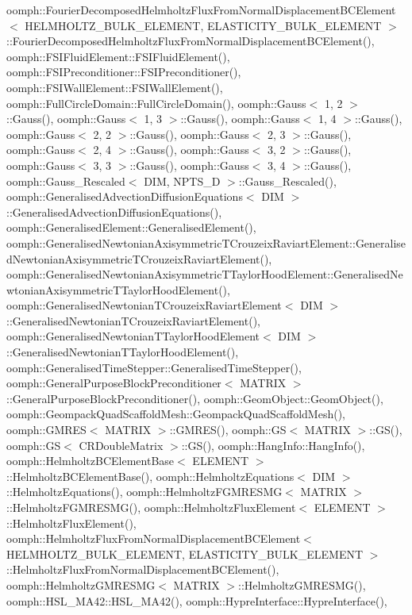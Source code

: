 oomph\+::\+Fourier\+Decomposed\+Helmholtz\+Flux\+From\+Normal\+Displacement\+B\+C\+Element$<$ H\+E\+L\+M\+H\+O\+L\+T\+Z\+\_\+\+B\+U\+L\+K\+\_\+\+E\+L\+E\+M\+E\+N\+T, E\+L\+A\+S\+T\+I\+C\+I\+T\+Y\+\_\+\+B\+U\+L\+K\+\_\+\+E\+L\+E\+M\+E\+N\+T $>$\+::\+Fourier\+Decomposed\+Helmholtz\+Flux\+From\+Normal\+Displacement\+B\+C\+Element(), oomph\+::\+F\+S\+I\+Fluid\+Element\+::\+F\+S\+I\+Fluid\+Element(), oomph\+::\+F\+S\+I\+Preconditioner\+::\+F\+S\+I\+Preconditioner(), oomph\+::\+F\+S\+I\+Wall\+Element\+::\+F\+S\+I\+Wall\+Element(), oomph\+::\+Full\+Circle\+Domain\+::\+Full\+Circle\+Domain(), oomph\+::\+Gauss$<$ 1, 2 $>$\+::\+Gauss(), oomph\+::\+Gauss$<$ 1, 3 $>$\+::\+Gauss(), oomph\+::\+Gauss$<$ 1, 4 $>$\+::\+Gauss(), oomph\+::\+Gauss$<$ 2, 2 $>$\+::\+Gauss(), oomph\+::\+Gauss$<$ 2, 3 $>$\+::\+Gauss(), oomph\+::\+Gauss$<$ 2, 4 $>$\+::\+Gauss(), oomph\+::\+Gauss$<$ 3, 2 $>$\+::\+Gauss(), oomph\+::\+Gauss$<$ 3, 3 $>$\+::\+Gauss(), oomph\+::\+Gauss$<$ 3, 4 $>$\+::\+Gauss(), oomph\+::\+Gauss\+\_\+\+Rescaled$<$ D\+I\+M, N\+P\+T\+S\+\_\+D $>$\+::\+Gauss\+\_\+\+Rescaled(), oomph\+::\+Generalised\+Advection\+Diffusion\+Equations$<$ D\+I\+M $>$\+::\+Generalised\+Advection\+Diffusion\+Equations(), oomph\+::\+Generalised\+Element\+::\+Generalised\+Element(), oomph\+::\+Generalised\+Newtonian\+Axisymmetric\+T\+Crouzeix\+Raviart\+Element\+::\+Generalised\+Newtonian\+Axisymmetric\+T\+Crouzeix\+Raviart\+Element(), oomph\+::\+Generalised\+Newtonian\+Axisymmetric\+T\+Taylor\+Hood\+Element\+::\+Generalised\+Newtonian\+Axisymmetric\+T\+Taylor\+Hood\+Element(), oomph\+::\+Generalised\+Newtonian\+T\+Crouzeix\+Raviart\+Element$<$ D\+I\+M $>$\+::\+Generalised\+Newtonian\+T\+Crouzeix\+Raviart\+Element(), oomph\+::\+Generalised\+Newtonian\+T\+Taylor\+Hood\+Element$<$ D\+I\+M $>$\+::\+Generalised\+Newtonian\+T\+Taylor\+Hood\+Element(), oomph\+::\+Generalised\+Time\+Stepper\+::\+Generalised\+Time\+Stepper(), oomph\+::\+General\+Purpose\+Block\+Preconditioner$<$ M\+A\+T\+R\+I\+X $>$\+::\+General\+Purpose\+Block\+Preconditioner(), oomph\+::\+Geom\+Object\+::\+Geom\+Object(), oomph\+::\+Geompack\+Quad\+Scaffold\+Mesh\+::\+Geompack\+Quad\+Scaffold\+Mesh(), oomph\+::\+G\+M\+R\+E\+S$<$ M\+A\+T\+R\+I\+X $>$\+::\+G\+M\+R\+E\+S(), oomph\+::\+G\+S$<$ M\+A\+T\+R\+I\+X $>$\+::\+G\+S(), oomph\+::\+G\+S$<$ C\+R\+Double\+Matrix $>$\+::\+G\+S(), oomph\+::\+Hang\+Info\+::\+Hang\+Info(), oomph\+::\+Helmholtz\+B\+C\+Element\+Base$<$ E\+L\+E\+M\+E\+N\+T $>$\+::\+Helmholtz\+B\+C\+Element\+Base(), oomph\+::\+Helmholtz\+Equations$<$ D\+I\+M $>$\+::\+Helmholtz\+Equations(), oomph\+::\+Helmholtz\+F\+G\+M\+R\+E\+S\+M\+G$<$ M\+A\+T\+R\+I\+X $>$\+::\+Helmholtz\+F\+G\+M\+R\+E\+S\+M\+G(), oomph\+::\+Helmholtz\+Flux\+Element$<$ E\+L\+E\+M\+E\+N\+T $>$\+::\+Helmholtz\+Flux\+Element(), oomph\+::\+Helmholtz\+Flux\+From\+Normal\+Displacement\+B\+C\+Element$<$ H\+E\+L\+M\+H\+O\+L\+T\+Z\+\_\+\+B\+U\+L\+K\+\_\+\+E\+L\+E\+M\+E\+N\+T, E\+L\+A\+S\+T\+I\+C\+I\+T\+Y\+\_\+\+B\+U\+L\+K\+\_\+\+E\+L\+E\+M\+E\+N\+T $>$\+::\+Helmholtz\+Flux\+From\+Normal\+Displacement\+B\+C\+Element(), oomph\+::\+Helmholtz\+G\+M\+R\+E\+S\+M\+G$<$ M\+A\+T\+R\+I\+X $>$\+::\+Helmholtz\+G\+M\+R\+E\+S\+M\+G(), oomph\+::\+H\+S\+L\+\_\+\+M\+A42\+::\+H\+S\+L\+\_\+\+M\+A42(), oomph\+::\+Hypre\+Interface\+::\+Hypre\+Interface(), 